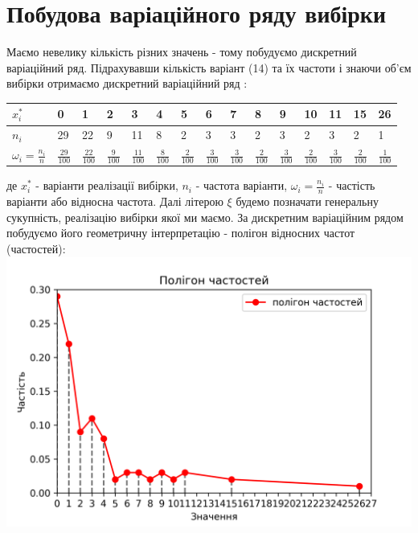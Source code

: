 \documentclass{article}
\begin{document}
\section{Побудова варіаційного ряду вибірки }
Маємо невелику кількість різних значень - тому побудуємо 
дискретний варіаційний ряд.
Підрахувавши кількість варіант (14) та їх частоти і знаючи 
об’єм вибірки отримаємо 
дискретний варіаційний ряд :
\newline
\newline
\begin{tabular}{|l|l|l|l|l|l|l|l|l|l|l|l|l|l|l|}
  \hline
  $x_i^*$& 0 & 1 & 2 & 3 & 4 & 5 & 6 & 7 & 8 & 9 & 10 & 11 & 15 & 26\\
  \hline
  $n_i$& 29 & 22 & 9 & 11 & 8 & 2 & 3 & 3 & 2 & 3 & 2 & 3 & 2 & 1\\
  \hline
  $\omega_i = \frac{n_i}{n}$ & $\frac{29}{100}$ & 
  $\frac{22}{100}$ & $\frac{9}{100}$ & $\frac{11}{100}$ & 
  $\frac{8}{100}$ & $\frac{2}{100}$ & $\frac{3}{100}$ 
  & $\frac{3}{100}$ & $\frac{2}{100}$ & $\frac{3}{100}$ & 
  $\frac{2}{100}$ & $\frac{3}{100}$ & $\frac{2}{100}$ & 
  $\frac{1}{100}$\\
  \hline
\end{tabular}
\newline
\newline
де $x_i^*$ - варіанти реалізації вибірки, $n_i$ - частота 
варіанти, $\omega_i = \frac{n_i}{n}$ - частість варіанти або 
відносна частота.
\newline
\newline
Далі літерою $\xi$ будемо позначати генеральну сукупність, 
реалізацію вибірки якої ми маємо.
\newpage
За дискретним варіаційним рядом побудуємо його геометричну 
інтерпретацію - полігон відносних частот (частостей):
\newline
\includegraphics[scale = 0.9]{pol}
\end{document}
